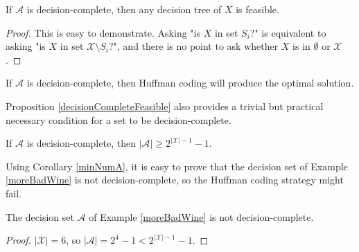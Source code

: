 \begin{proposition}
\label{decisionCompleteFeasible}
If $\mathscr{A}$ is decision-complete, then any decision tree of $X$ is feasible.
\end{proposition}

\begin{proof}
This is easy to demonstrate. Asking "is $X$ in set $S_i$?" is equivalent to asking "is $X$ in set $\mathcal{X} \setminus S_i$?", and there is no point to ask whether $X$ is in $\emptyset$ or $\mathcal{X}$.
\end{proof}

\begin{corollary}
\label{equivHuffman}
If $\mathscr{A}$ is decision-complete, then Huffman coding will produce the optimal solution.
\end{corollary}


Proposition \ref{decisionCompleteFeasible} also provides a trivial but practical necessary condition for a set to be decision-complete.

\begin{corollary}
\label{minNumA}
If $\mathscr{A}$ is decision-complete, then $|\mathscr{A}| \ge 2^{|\mathcal{X}|-1} - 1$.
\end{corollary}

Using Corollary \ref{minNumA}, it is easy to prove that the decision set of Example \ref{moreBadWine} is not decision-complete,  so the Huffman coding strategy might fail.

\begin{proposition}
The decision set $\mathscr{A}$ of Example \ref{moreBadWine} is not decision-complete.
\end{proposition}

\begin{proof}
$|\mathcal{X}|=6$, so $|\mathscr{A}| = 2^4 - 1 < 2 ^{ |\mathcal{X}|-1} - 1$.
\end{proof}

